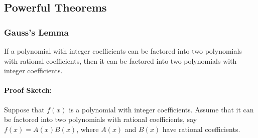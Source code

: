 \subsection{Powerful Theorems}

\subsubsection{Gauss's Lemma}

\begin{lemma}
If a polynomial with integer coefficients can be factored into two polynomials with rational coefficients, then it can be factored into two polynomials with integer coefficients.
\end{lemma}
\paragraph{Proof Sketch:}

Suppose that $f(x)$ is a polynomial with integer coefficients. Assume that it can be factored into two polynomials with rational coefficients, say $f(x) = A(x)B(x)$, where $A(x)$ and $B(x)$ have rational coefficients.

